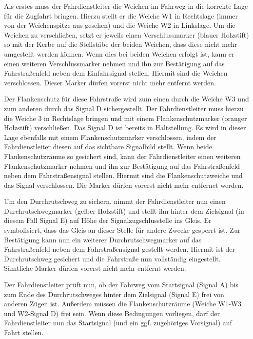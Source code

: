    Als erstes muss der Fahrdienstleiter die Weichen im Fahrweg in die korrekte Lage für die Zugfahrt bringen. Hierzu stellt er die Weiche W1 in Rechtslage (immer von der Weichenspitze aus gesehen) und die Weiche W2 in Linkslage. Um die Weichen zu verschließen, setzt er jeweils einen Verschlussmarker (blauer Holzstift) so mit der Kerbe auf die Stellstäbe der beiden Weichen, dass diese nicht mehr umgestellt werden können. Wenn dies bei beiden Weichen erfolgt ist, kann er einen weiteren Verschlussmarker nehmen und ihn zur Bestätigung auf das Fahrstraßenfeld neben dem Einfahrsignal stellen. Hiermit sind die Weichen verschlossen. Dieser Marker dürfen vorerst nicht mehr entfernt werden.

   Der Flankenschutz für diese Fahrstraße wird zum einen durch die Weiche W3 und zum anderen durch das Signal D sichergestellt. Der Fahrdienstleiter muss hierzu die Weiche 3 in Rechtslage bringen und mit einem Flankenschutzmarker (oranger Holzstift) verschließen. Das Signal D ist bereits in Haltstellung. Es wird in dieser Lage ebenfalls mit einem Flankenschutzmarker verschlossen, indem der Fahrdienstleiter diesen auf das sichtbare Signalbild stellt. Wenn beide Flankenschutzräume so gesichert sind, kann der Fahrdienstleiter einen weiteren Flankenschutzmarker nehmen und ihn zur Bestätigung auf das Fahrstraßenfeld neben dem Fahrstraßensignal stellen. Hiermit sind die Flankenschutzweiche und das Signal verschlossen. Die Marker dürfen vorerst nicht mehr entfernet werden.

   Um den Durchrutschweg zu sichern, nimmt der Fahrdienstleiter nun einen Durchrutschwegmarker (gelber Holzstift) und stellt ihn hinter dem Zielsignal (in diesem Fall Signal E) auf Höhe der Signalzugschlusstelle ins Gleis. Er symbolisiert, dass das Gleis an dieser Stelle für andere Zwecke gesperrt ist. Zur Bestätigung kann nun ein weiterer Durchrutschwegmarker auf das Fahrstraßenfeld neben dem Fahrstraßensignal gestellt werden. Hiermit ist der Durchrutschweg gesichert und die Fahrstraße nun vollständig eingestellt. Sämtliche Marker dürfen vorerst nicht mehr entfernt werden.

   Der Fahrdienstleiter prüft nun, ob der Fahrweg vom Startsignal (Signal A) bis zum Ende des Durchrutschweges hinter dem Zielsignal (Signal E) frei von anderen Zügen ist. Außerdem müssen die Flankenschutzräume (Weiche W1-W3 und W2-Signal D) frei sein. Wenn diese Bedingungen vorliegen, darf der Fahrdienstleiter nun das Startsignal (und ein ggf. zugehöriges Vorsignal) auf Fahrt stellen.

